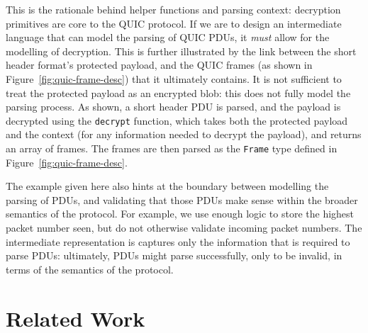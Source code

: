 \documentclass[10pt,sigconf]{acmart}
\begin{document}
This is the rationale behind helper functions and parsing context: decryption primitives are
core to the QUIC
protocol. If we are to design an intermediate language that can model the parsing of QUIC
PDUs, it \emph{must} allow for the modelling of decryption. This is further illustrated
by the link between the short header format's protected payload, and the QUIC frames (as
shown in Figure~\ref{fig:quic-frame-desc}) that it ultimately contains. It is not sufficient
to treat the protected payload as an encrypted blob: this does not fully model the parsing
process. As shown, a short header PDU is parsed, and the payload is decrypted using the
\texttt{decrypt} function, which takes both the protected payload and the context (for any
information needed to decrypt the payload), and returns an array of frames. The frames are
then parsed as the \texttt{Frame} type defined in Figure~\ref{fig:quic-frame-desc}.

The example given here also hints at the boundary between modelling the parsing of 
PDUs, and validating that those PDUs make sense within the broader semantics 
of the protocol. For example, we use enough logic to store the highest packet number seen,
but do not otherwise validate incoming packet numbers. The intermediate representation is
captures only the information that is required to parse PDUs: ultimately, PDUs
might parse successfully, only to be invalid, in terms of the semantics of the protocol.

\section{Related Work}
\label{sec:related}

%
% 
\end{document}

